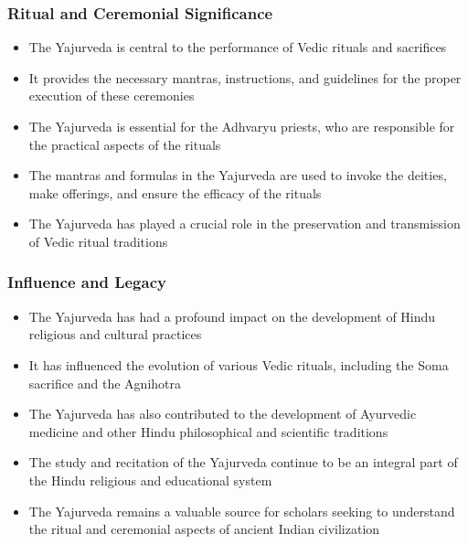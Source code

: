 \begin{frame}[fragile]\frametitle{Ritual and Ceremonial Significance}
    \begin{itemize}
        \item The Yajurveda is central to the performance of Vedic rituals and sacrifices
        \item It provides the necessary mantras, instructions, and guidelines for the proper execution of these ceremonies
        \item The Yajurveda is essential for the Adhvaryu priests, who are responsible for the practical aspects of the rituals
        \item The mantras and formulas in the Yajurveda are used to invoke the deities, make offerings, and ensure the efficacy of the rituals
        \item The Yajurveda has played a crucial role in the preservation and transmission of Vedic ritual traditions
    \end{itemize}
\end{frame}

\begin{frame}[fragile]\frametitle{Influence and Legacy}
    \begin{itemize}
        \item The Yajurveda has had a profound impact on the development of Hindu religious and cultural practices
        \item It has influenced the evolution of various Vedic rituals, including the Soma sacrifice and the Agnihotra
        \item The Yajurveda has also contributed to the development of Ayurvedic medicine and other Hindu philosophical and scientific traditions
        \item The study and recitation of the Yajurveda continue to be an integral part of the Hindu religious and educational system
        \item The Yajurveda remains a valuable source for scholars seeking to understand the ritual and ceremonial aspects of ancient Indian civilization
    \end{itemize}
\end{frame}
